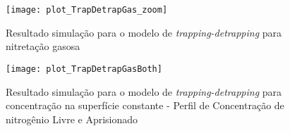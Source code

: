\begin{figure}[ht]
\centering
	\caption{Resultado simulação para o modelo de \textit{trapping-detrapping} para nitretação gasosa }
	\texttt{[image: plot\_TrapDetrapGas\_zoom]}
	\label{fig:td-csvar-gas}
	\centering
\end{figure}


\begin{figure}[ht]
\centering
	\caption{Resultado simulação para o modelo de \textit{trapping-detrapping} para concentração na superfície constante - Perfil de Concentração de nitrogênio Livre e Aprisionado }
	\texttt{[image: plot\_TrapDetrapGasBoth]}
	\label{fig:td-csvar-gas}
	\centering
\end{figure}